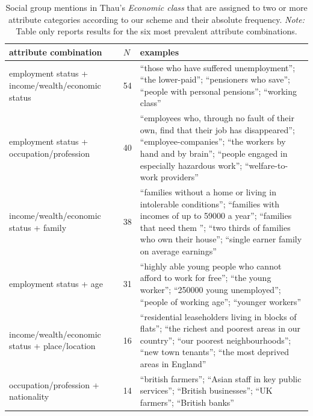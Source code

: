 \begin{table}[!th]
\centering
\caption{Social group mentions in Thau's \emph{Economic class} that are assigned to two or more attribute categories according to our scheme and their absolute frequency. \emph{Note:} Table only reports results for the six most prevalent attribute combinations.}
\label{tableC07}
\begin{tabular}{p{2.2in} l L{3in}}
\toprule
attribute combination & $N$ & examples \\
\midrule
employment status + income/wealth/economic status & 54 & ``those who have suffered unemployment''; ``the lower-paid''; ``pensioners who save''; ``people with personal pensions''; ``working class'' \\
employment status + occupation/profession & 40 & ``employees who, through no fault of their own, find that their job has disappeared''; ``employee-companies''; ``the workers by hand and by brain''; ``people engaged in especially hazardous work''; ``welfare-to-work providers'' \\
income/wealth/economic status + family & 38 & ``families without a home or living in intolerable conditions''; ``families with incomes of up to 59000 a year''; ``families that need them ''; ``two thirds of families who own their house''; ``single earner family on average earnings'' \\
employment status + age & 31 & ``highly able young people who cannot afford to work for free''; ``the young worker''; ``250000 young unemployed''; ``people of working age''; ``younger workers'' \\
income/wealth/economic status + place/location & 16 & ``residential leaseholders living in blocks of flats''; ``the richest and poorest areas in our country''; ``our poorest neighbourhoods''; ``new town tenants''; ``the most deprived areas in England'' \\
occupation/profession + nationality & 14 & ``british farmers''; ``Asian staff in key public services''; ``British businesses''; ``UK farmers''; ``British banks'' \\
\bottomrule
\end{tabular}
\end{table}
